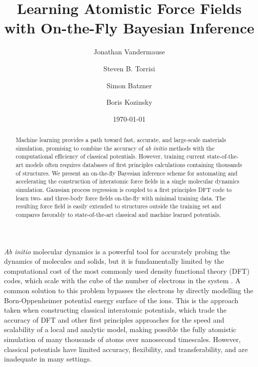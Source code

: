 \documentclass[%
reprint,
superscriptaddress,
amsmath,amssymb,
aps,
prl,
]{revtex4-1}
\begin{document}
\title{Learning Atomistic Force Fields with On-the-Fly Bayesian Inference}

\author{Jonathan Vandermause}

\author{Steven B. Torrisi}

\author{Simon Batzner}

\author{Boris Kozinsky}


\date{\today}

\begin{abstract}
  Machine learning provides a path toward fast, accurate, and large-scale materials simulation, promising to combine the accuracy of \textit{ab initio} methods with the computational efficiency of classical potentials. However, training current state-of-the-art models often requires databases of first principles calculations containing thousands of structures. We present an on-the-fly Bayesian inference scheme for automating and accelerating the construction of interatomic force fields in a single molecular dynamics simulation. Gaussian process regression is coupled to a first principles DFT code to learn two- and three-body force fields on-the-fly with minimal training data. The resulting force field is easily extended to structures outside the training set and compares favorably to state-of-the-art classical and machine learned potentials.
\end{abstract}

\maketitle

\textit{Ab initio} molecular dynamics is a powerful tool for
accurately probing the dynamics of molecules and solids, but it is fundamentally limited by the computational cost of the most commonly used density functional theory (DFT) codes, which scale with the cube of the number of electrons in the system \cite{kohn1999nobel}. A common solution to this problem bypasses the electrons by directly modelling the Born-Oppenheimer potential energy surface of the ions. This is the approach taken when constructing classical interatomic potentials, which trade the accuracy of DFT and other first principles approaches for the speed and scalability of a local and analytic model, making possible the fully atomistic simulation of many thousands of atoms over nanosecond timescales. However, classical potentials have limited accuracy, flexibility, and transferability, and are inadequate in many settings.
\end{document}
